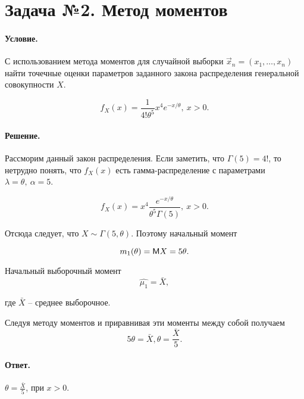 
\section{Задача №2. Метод моментов}

\paragraph{Условие.}  
С использованием метода моментов для случайной выборки $\vec{x}_n = (x_1, \dots, x_n)$ найти точечные оценки параметров заданного закона распределения генеральной совокупности $X$.

\[
f_{X}(x)= \frac{1}{4!\theta^5}x^4 e^{-x/\theta},~x > 0.
\]

\paragraph{Решение.} Рассморим данный закон распределения. Если заметить, что $\Gamma(5)=4!$, то нетрудно понять, что $f_{X}(x)$ есть гамма-распределение  с параметрами $\lambda=\theta,~\alpha=5$.

\[
f_{X}(x)=x^4\frac{e^{-x/\theta}}{\theta^5 \Gamma(5)},~x > 0.
\]

Отсюда следует, что $X \sim \Gamma(5, \theta)$. Поэтому начальный момент 

\[
m_1(\theta) = \mathsf{M} X=5\theta.
\]

Начальный выборочный момент
\[
\hat{\mu_1} = \bar{X},
\]

где $\bar{X}$ -- среднее выборочное.

Следуя методу моментов и приравнивая эти моменты между собой получаем 
\[
5\theta=\bar{X},
\theta=\frac{\bar{X}}{5}.
\]

\paragraph{Ответ.} $\theta=\frac{\bar{X}}{5}$, при  $x>0$.